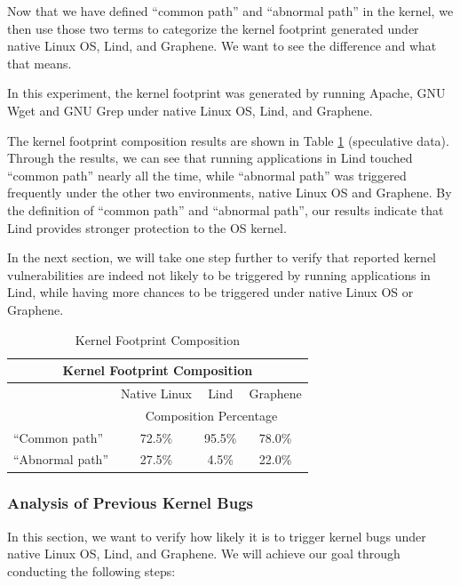 \par
Now that we have defined ``common path'' and ``abnormal path'' in the kernel, we then use those two terms to categorize the kernel footprint generated under native Linux OS, Lind, and Graphene. We want to see the difference and what that means. 

\par
In this experiment, the kernel footprint was generated by running Apache, GNU Wget and GNU Grep under native Linux OS, Lind, and Graphene. 

\par
The kernel footprint composition results are shown in Table \ref{table:kernel_footprint_composition} (speculative data). 
Through the results, we can see that running applications in Lind touched ``common path'' nearly all the time, while ``abnormal path'' was triggered frequently under the other two environments, native Linux OS and Graphene. By the definition of ``common path'' and ``abnormal path'', our results indicate that Lind provides stronger protection to the OS kernel. 

\par  
In the next section, we will take one step further to verify that reported kernel vulnerabilities are indeed not likely to be triggered by running applications in Lind, while having more chances to be triggered under native Linux OS or Graphene. 


\begin{table}
\begin{tabular}{lccc}
\toprule
\multicolumn{4}{c}{Kernel Footprint Composition} \\
\midrule
 & Native Linux    &  Lind & Graphene \\
\cmidrule(r){2-4}
& \multicolumn{3}{c}{Composition Percentage} \\
\midrule
``Common path''     &   72.5\%      & 95.5\%    & 78.0\%      \\
``Abnormal path''    &  27.5\%      & 4.5\%       & 22.0\%       \\
\bottomrule
\end{tabular}
\caption {Kernel Footprint Composition}
\label{table:kernel_footprint_composition}
\end{table}


\subsubsection{Analysis of Previous Kernel Bugs}

\par
In this section, we want to verify how likely it is to trigger kernel bugs under native Linux OS, Lind, and Graphene.
We will achieve our goal through conducting the following steps: \\


